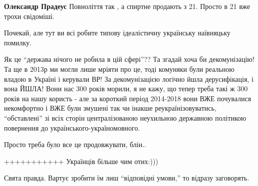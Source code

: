 \begin{itemize}
\begin{itemize}
\textbf{Олександр Прадеус} Повноліття так , а спиртне продають з 21. Просто в 21 вже трохи свідоміші.
\end{itemize} %


Почекай, але тут ви всі робите типову ідеалістичну українську наївняцьку
помилку.

Як це \enquote{держава нічого не робила в цій сфері}?? Та згадай хоча би декомунізацію!
Та ще в 2013р ми могли лише мріяти про це, тоді комуняки були реальною владою в
Україні і керували ВР! За декомунізацією логічно йшла дерусифікація, і вона
ЙШЛА! Вони нас 300 років морили, я не кажу, що тепер треба такі ж 300 років на
нашу користь - але за короткий період 2014-2018 вони ВЖЕ почувалися некомфортно
і ВЖЕ були змушені так чи інакше реукраїнізовуватись, \enquote{обставлені} зі всіх
сторін централізованою неухильною державною політикою повернення до
українського-україномовного.

Просто треба було все це продовжувати, блін..

+++++++++++
Українців більше чим отих:)))

Свята правда. Вартує зробити їм лиш \enquote{відповідні умови,} то відразу заговорять.




\end{itemize} %
